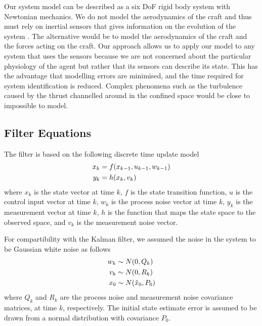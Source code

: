 \documentclass[]{article}
\begin{document}
{%

Our system model can be described as a six DoF rigid body system with Newtonian mechanics. We do not model the aerodynamics of the craft and thus must rely on inertial sensors that gives information on the evolution of the system \cite{OpenPilotPaper}. The alternative would be to model the aerodynamics of the craft and the forces acting on the craft. Our approach allows us to apply our model to any system that uses the sensors because we are not concerned about the particular physiology of the agent but rather that its sensors can describe its state.
This has the advantage that modelling errors are minimised, and the time required for system identification is reduced.
Complex phenomena such as the turbulence caused by the thrust channelled around in the confined space would be close to impossible to model.

\subsection{Filter Equations} %
\label{sub:filter_equations}

The filter is based on the following discrete time update model
\begin{align}
	x_k &= f(x_{k-1}, u_{k-1}, w_{k-1}) \notag \\
	y_k &= h(x_k, v_k)
	\label{eqn:system}
\end{align}
where $x_k$ is the state vector at time $k$, $f$ is the state transition function, $u$ is the control input vector at time $k$, $w_k$ is the process noise vector at time $k$, $y_k$ is the measurement vector at time $k$, $h$ is the function that maps the state space to the observed space, and $v_k$ is the measurement noise vector.

For compartibility with the Kalman filter, we assumed the noise in the system to be Gaussian white noise as follows
\begin{align}
	w_k &\sim N(0,Q_k) \notag \\
	v_k &\sim N(0,R_k) \notag \\
	x_0 &\sim N(\hat{x}_0,P_0)
	\label{eqn:noisedef}
\end{align}
where $Q_k$ and $R_k$ are the process noise and measurement noise covariance matrices, at time $k$, respectively. The initial state estimate error is assumed to be drawn from a normal distribution with covariance $P_0$.

}
\end{document}
